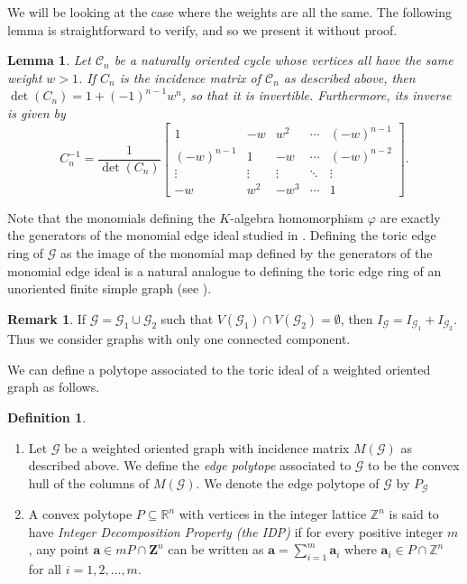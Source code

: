 \documentclass [12pt,a4paper,reqno]{amsart}
\theoremstyle{plain}
\newtheorem{Lemma}[Theorem]{Lemma}
\theoremstyle{definition}
\newtheorem{Assumptions and Discussion}[Theorem]{Assumptions and Discussion}
\newtheorem{Definition}[Theorem]{Definition}
\newtheorem{remark}[Theorem]{Remark}
\theoremstyle{remark}
\newcommand\calC{\mathcal{C}}
\newcommand\calG{\mathcal{G}}
\begin{document}
We will be looking at the case where the weights are all the same. The following lemma is straightforward to verify, and so we present it without proof. 

\begin{Lemma}\label{invC_n}
    Let $\calC_n$ be a naturally oriented cycle whose vertices all have the same weight $w>1$. If $C_n$ is the incidence matrix of $\calC_n$ as described above, then $\det(C_n)=1+(-1)^{n-1}w^n$, so that it is invertible. Furthermore, its inverse is given by 
    \[
        C_n^{-1}=\frac{1}{\det(C_n)}\begin{bmatrix}
             1 & -w & w^2 & \cdots & (-w)^{n-1}\\
            (-w)^{n-1} & 1 & -w & \cdots & (-w)^{n-2}\\
            \vdots & \vdots & \vdots & \ddots & \vdots\\
            -w & w^2 & -w^3 & \cdots & 1
        \end{bmatrix}.
    \]
\end{Lemma}

Note that the monomials defining the $K$-algebra homomorphism $\varphi$ are exactly the generators of the monomial edge ideal studied in \cites{KBLO, GMSV, HLMRV, MPV, pitones2019monomial}. Defining the toric edge ring of $\calG$ as the image of the monomial map defined by the generators of the monomial edge ideal is a natural analogue to defining the toric edge ring of an unoriented finite simple graph (see \cites{OH, V}).



\begin{remark}\label{rem:disjoint}
If $\calG=\calG_{1}\cup\calG_{2}$ such that $V(\calG_{1})\cap V(\calG_{2})=\emptyset$,
then $I_{\calG}=I_{\calG_1}+ I_{\calG_2}$. Thus we consider graphs with only one connected component.
\end{remark}

We can define a polytope associated to the toric ideal of a weighted oriented graph as follows.



\begin{Definition} \label{normal} 
\begin{enumerate}[a]
    \item Let $\calG$ be a weighted oriented graph with incidence matrix $M(\calG)$ as described above.   We define the \emph{edge polytope} associated to $\calG$ to be the convex hull of the columns of $M(\calG)$.  We denote the edge polytope of $\calG$ by $P_\calG$
    \item A convex polytope $P \subseteq \mathbb{R}^n$ with vertices in the integer lattice $\mathbb{Z}^n$ is said to have \emph{Integer Decomposition Property (the IDP)} if for every positive integer $m$, any point $\mathbf{a}\in mP\cap\mathbf{Z}^n$ can be written as $\mathbf{a}=\sum_{i=1}^m\mathbf{a}_i$ where $\mathbf{a}_i\in P\cap\mathbb{Z}^n$ for all $i=1,2,\dots,m$. 
\end{enumerate}
\end{Definition}
\end{document}
